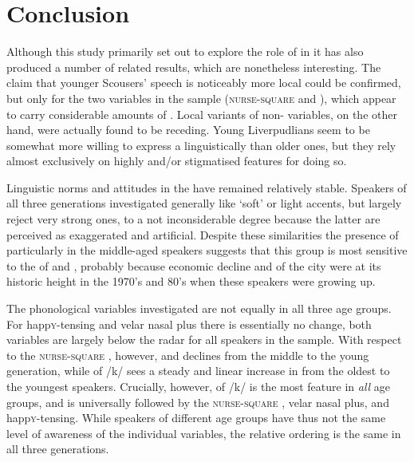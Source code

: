\chapter{Conclusion}
\label{ch.conclusion}

Although this study primarily set out to explore the role of  in   it has also produced a number of related results, which are nonetheless interesting.
The claim that younger Scousers' speech is noticeably more local \parencite[cf.][]{watson2007a} could be confirmed, but only for the two  variables in the sample (\textsc{nurse}-\textsc{square} and ), which appear to carry considerable amounts of  .
Local variants of non- variables, on the other hand, were actually found to be receding.
Young Liverpudlians seem to be somewhat more willing to express a  linguistically than older ones, but they rely almost exclusively on highly  and/or stigmatised features for doing so.

Linguistic norms and attitudes in the  have remained relatively stable.
Speakers of all three generations investigated generally like `soft' or light  accents, but largely reject very strong ones, to a not inconsiderable degree because the latter are perceived as exaggerated and artificial.
Despite these similarities the presence of  particularly in the middle-aged speakers suggests that this group is most sensitive to the  of  and , probably because economic decline and  of the city were at its historic height in the 1970's and 80's when these speakers were growing up.

The phonological variables investigated are not equally  in all three age groups.
For happ\textsc{y}-tensing and velar nasal plus there is essentially no change, both variables are largely below the radar for all speakers in the sample.
With respect to the \textsc{nurse}-\textsc{square} , however,  and  declines from the middle to the young generation, while  of /k/ sees a steady and linear increase in  from the oldest to the youngest speakers.
Crucially, however,  of /k/ is the most  feature in \emph{all} age groups, and is universally followed by the \textsc{nurse}-\textsc{square} , velar nasal plus, and happ\textsc{y}-tensing.
While speakers of different age groups have thus not the same level of awareness of the individual variables, the relative ordering is the same in all three generations.

